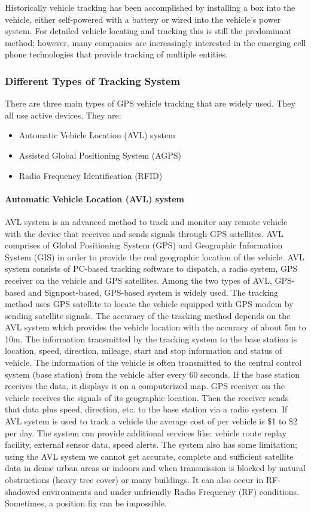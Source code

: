 Historically vehicle tracking has been accomplished by installing a box into the vehicle, either
self-powered with a battery or wired into the vehicle's power system. For detailed vehicle
locating and tracking this is still the predominant method; however, many companies are
increasingly interested in the emerging cell phone technologies that provide tracking of multiple
entities.

\subsubsection{Different Types of Tracking System}
There are three main types of GPS vehicle tracking that are widely used. They all use active
devices. They are:
\begin{itemize}
	\item Automatic Vehicle Location (AVL) system
	\item Assisted Global Positioning System (AGPS)
	\item Radio Frequency Identification (RFID)
\end{itemize}

\paragraph{Automatic Vehicle Location (AVL) system}
AVL system is an advanced method to
track and monitor any remote vehicle with the device that receives and sends signals
through GPS satellites. AVL comprises of Global Positioning System (GPS) and
Geographic Information System (GIS) in order to provide the real geographic location of
the vehicle. AVL system consists of PC-based tracking software to dispatch, a radio
system, GPS receiver on the vehicle and GPS satellites. Among the two types of AVL,
GPS-based and Signpost-based, GPS-based system is widely used. The tracking method
uses GPS satellite to locate the vehicle equipped with GPS modem by sending satellite
signals. The accuracy of the tracking method depends on the AVL system which provides
the vehicle location with the accuracy of about 5m to 10m. The information transmitted
by the tracking system to the base station is location, speed, direction, mileage, start and stop information and status of vehicle. The information of the vehicle is often transmitted
to the central control system (base station) from the vehicle after every 60 seconds. If the
base station receives the data, it displays it on a computerized map. GPS receiver on the
vehicle receives the signals of its geographic location. Then the receiver sends that data
plus speed, direction, etc. to the base station via a radio system. If AVL system is used to
track a vehicle the average cost of per vehicle is \$1 to \$2 per day. The system can provide
additional services like: vehicle route replay facility, external sensor data, speed alerts.
The system also has some limitation; using the AVL system we cannot get accurate,
complete and sufficient satellite data in dense urban areas or indoors and when
transmission is blocked by natural obstructions (heavy tree cover) or many buildings. It
can also occur in RF-shadowed environments and under unfriendly Radio Frequency
(RF) conditions. Sometimes, a position fix can be impossible.

